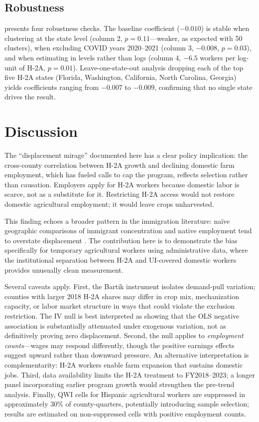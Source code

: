 \documentclass[12pt]{article}
\begin{document}


\subsection{Robustness}

 presents four robustness checks. The baseline coefficient ($-0.010$) is stable when clustering at the state level (column 2, $p = 0.11$---weaker, as expected with 50 clusters), when excluding COVID years 2020--2021 (column 3, $-0.008$, $p = 0.03$), and when estimating in levels rather than logs (column 4, $-6.5$ workers per log-unit of H-2A, $p = 0.01$). Leave-one-state-out analysis dropping each of the top five H-2A states (Florida, Washington, California, North Carolina, Georgia) yields coefficients ranging from $-0.007$ to $-0.009$, confirming that no single state drives the result.



\section{Discussion}

The ``displacement mirage'' documented here has a clear policy implication: the cross-county correlation between H-2A growth and declining domestic farm employment, which has fueled calls to cap the program, reflects selection rather than causation. Employers apply for H-2A workers because domestic labor is scarce, not as a substitute for it. Restricting H-2A access would not restore domestic agricultural employment; it would leave crops unharvested.

This finding echoes a broader pattern in the immigration literature: na\"ive geographic comparisons of immigrant concentration and native employment tend to overstate displacement \citep{Peri2016, Dustmann2016}. The contribution here is to demonstrate the bias specifically for temporary agricultural workers using administrative data, where the institutional separation between H-2A and UI-covered domestic workers provides unusually clean measurement.

Several caveats apply. First, the Bartik instrument isolates demand-pull variation; counties with larger 2018 H-2A shares may differ in crop mix, mechanization capacity, or labor market structure in ways that could violate the exclusion restriction. The IV null is best interpreted as showing that the OLS negative association is substantially attenuated under exogenous variation, not as definitively proving zero displacement. Second, the null applies to \textit{employment counts}---wages may respond differently, though the positive earnings effects suggest upward rather than downward pressure. An alternative interpretation is complementarity: H-2A workers enable farm expansion that sustains domestic jobs. Third, data availability limits the H-2A treatment to FY2018--2023; a longer panel incorporating earlier program growth would strengthen the pre-trend analysis. Finally, QWI cells for Hispanic agricultural workers are suppressed in approximately 30\% of county-quarters, potentially introducing sample selection; results are estimated on non-suppressed cells with positive employment counts.
\end{document}
